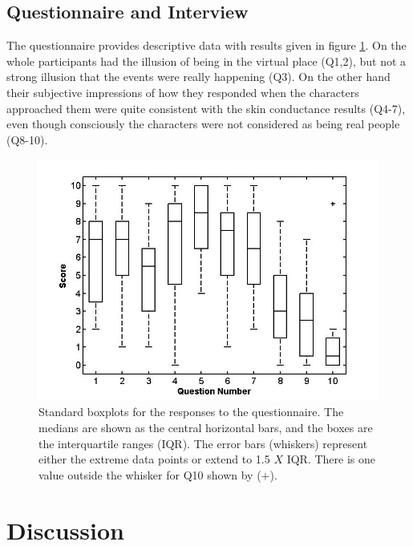 \documentclass[
		twoside,openright,titlepage,numbers=noenddot,manychapters,
		headinclude,%
                footinclude=false,cleardoublepage=empty,
                BCOR=5mm,
		fontsize=11pt, %
                 enabledeprecatedfontcommands]{scrreprt}
\begin{document}
\subsection{Questionnaire and Interview}
The questionnaire provides descriptive data with results given in figure \ref{fig_prox_results3}.  On the whole participants had the illusion of being in the virtual place (Q1,2), but not a strong illusion that the events were really happening (Q3). On the other hand their subjective impressions of how they responded when the characters approached them were quite consistent with the skin conductance results (Q4-7), even though consciously the characters were not considered as being real people (Q8-10).



\begin{figure}[tb]
\begin{center}
\includegraphics[width=12cm]{figures/proxemics/questionnaires.jpg}
\caption{Standard boxplots for the responses to the questionnaire. The medians are shown as the central horizontal bars, and the boxes are the interquartile ranges (IQR). The error bars (whiskers) represent either the extreme data points or extend to 1.5 $X$ IQR. There is one value outside the whisker for Q10  shown by ($+$).}
\label{fig_prox_results3}
\end{center}

\end{figure} 

\section{Discussion}
\end{document}
